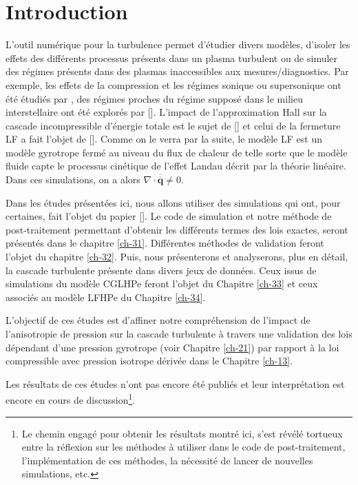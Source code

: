 \chapter*{Introduction}
 \adjustmtc
\renewcommand\partie{\Partie\ INTRO}
\label{ch-30}

\bigskip
\minitoc  

L'outil numérique pour la turbulence permet d'étudier divers modèles, d'isoler les effets des différents processus présents dans un plasma turbulent ou de simuler des régimes présents dans des plasmas inaccessibles aux mesures/diagnostics. Par exemple, les effets de la compression et les régimes sonique ou supersonique ont été étudiés par \cite{andres_energy_2018}, des régimes proches du régime supposé dans le milieu interstellaire ont été explorés par [\cite{federrath_comparing_2010,ferrand_compressible_2020}]. L'impact de l'approximation \acs{Hall} sur la cascade incompressible d'énergie totale est le sujet de [\cite{ferrand_exact_2019}] et celui de la fermeture \ac{LF} a fait l'objet de [\cite{ferrand_fluid_2021}]. Comme on le verra par la suite, le modèle \ac{LF} est un modèle gyrotrope fermé au niveau du flux de chaleur de telle sorte que le modèle fluide capte le processus cinétique de l'effet Landau décrit par la théorie linéaire. Dans ces simulations, on a alors $\nabla \cdot \overline{\overline{\boldsymbol{q}}} \neq 0$.

Dans les études présentées ici, nous allons utiliser des simulations qui ont, pour certaines, fait l'objet du papier [\cite{ferrand_fluid_2021}]. Le code de simulation et notre méthode de post-traitement permettant d'obtenir les différents termes des lois exactes, seront présentés dans le chapitre \ref{ch-31}. Différentes méthodes de validation feront l'objet du chapitre \ref{ch-32}. Puis, nous présenterons et analyserons, plus en détail, la cascade turbulente présente dans divers jeux de données. Ceux issus de simulations du modèle \acs{CGLHPe} feront l'objet du Chapitre \ref{ch-33} et ceux associés au modèle \acs{LFHPe} du Chapitre \ref{ch-34}.  

L'objectif de ces études est d'affiner notre compréhension de l'impact de l'anisotropie de pression sur la cascade turbulente à travers une validation des lois dépendant d'une pression gyrotrope (voir Chapitre \ref{ch-21}) par rapport à la loi compressible avec pression isotrope dérivée dans le Chapitre \ref{ch-13}. 

Les résultats de ces études n'ont pas encore été publiés et leur interprétation est encore en cours de discussion\footnote{Le chemin engagé pour obtenir les résultats montré ici, s'est révélé tortueux entre la réflexion sur les méthodes à utiliser dans le code de post-traitement, l'implémentation de ces méthodes, la nécessité de lancer de nouvelles simulations, etc. }.

